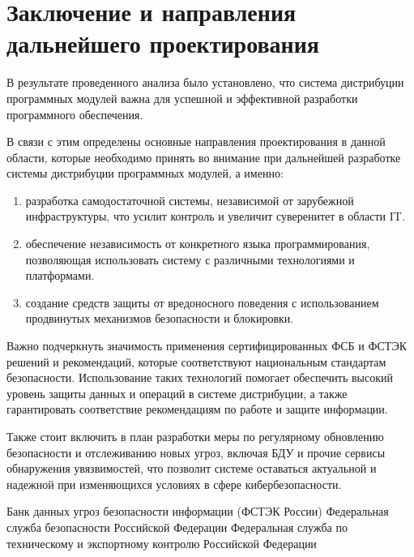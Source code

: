 \section{Заключение и направления дальнейшего проектирования}

В результате проведенного анализа было установлено, что система дистрибуции программных модулей важна для успешной и эффективной разработки программного обеспечения. 

В связи с этим определены основные направления проектирования в данной области, которые необходимо принять во внимание при дальнейшей разработке системы дистрибуции программных модулей, а именно:

\begin{enumerate}
\item разработка самодостаточной системы, независимой от зарубежной инфраструктуры, что усилит контроль и увеличит суверенитет в области IT.
\item обеспечение независимость от конкретного языка программирования, позволяющая использовать систему с различными технологиями и платформами.
\item создание средств защиты от вредоносного поведения с использованием продвинутых механизмов безопасности и блокировки.
\end{enumerate}

Важно подчеркнуть значимость применения сертифицированных ФСБ и ФСТЭК решений и рекомендаций, которые соответствуют национальным стандартам безопасности. Использование таких технологий помогает обеспечить высокий уровень защиты данных и операций в системе дистрибуции, а также гарантировать соответствие рекомендациям по работе и защите информации.

Также стоит включить в план разработки меры по регулярному обновлению безопасности и отслеживанию новых угроз, включая БДУ и прочие сервисы обнаружения увязвимостей, что позволит системе оставаться актуальной и надежной при изменяющихся условиях в сфере кибербезопасности.

 {Банк данных угроз безопасности информации (ФСТЭК России)}
 {Федеральная служба безопасности Российской Федерации}
 {Федеральная служба по техническому и экспортному контролю Российской Федерации}


